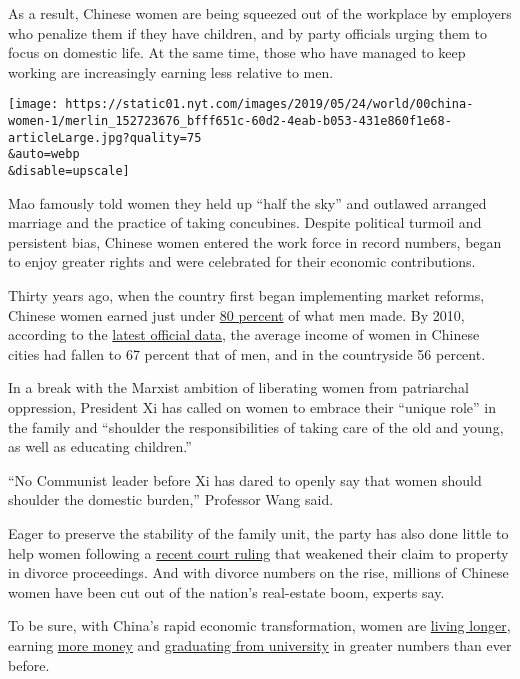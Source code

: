 As a result, Chinese women are being squeezed out of the workplace by
employers who penalize them if they have children, and by party
officials urging them to focus on domestic life. At the same time, those
who have managed to keep working are increasingly earning less relative
to men.

\texttt{[image: https://static01.nyt.com/images/2019/05/24/world/00china-women-1/merlin\_152723676\_bfff651c-60d2-4eab-b053-431e860f1e68-articleLarge.jpg?quality=75\\\&auto=webp\\\&disable=upscale]}

Mao famously told women they held up ``half the sky'' and outlawed
arranged marriage and the practice of taking concubines. Despite
political turmoil and persistent bias, Chinese women entered the work
force in record numbers, began to enjoy greater rights and were
celebrated for their economic contributions.

Thirty years ago, when the country first began implementing market
reforms, Chinese women earned just under
\href{http://www.stats.gov.cn/tjsj/tjgb/qttjgb/qgqttjgb/200203/t20020331_30606.html}{80
percent} of what men made. By 2010, according to the
\href{http://www.china.com.cn/zhibo/zhuanti/ch-xinwen/2011-10/21/content_23687810.htm}{latest
official data}, the average income of women in Chinese cities had fallen
to 67 percent that of men, and in the countryside 56 percent.

In a break with the Marxist ambition of liberating women from
patriarchal oppression, President Xi has called on women to embrace
their ``unique role'' in the family and ``shoulder the responsibilities
of taking care of the old and young, as well as educating children.''

``No Communist leader before Xi has dared to openly say that women
should shoulder the domestic burden,'' Professor Wang said.

Eager to preserve the stability of the family unit, the party has also
done little to help women following a
\href{https://www.nytimes.com/2011/09/08/world/asia/08iht-letter08.html}{recent
court ruling} that weakened their claim to property in divorce
proceedings. And with divorce numbers on the rise, millions of Chinese
women have been cut out of the nation's real-estate boom, experts say.

To be sure, with China's rapid economic transformation, women are
\href{http://www.chinadaily.com.cn/china/2017-07/26/content_30256796.htm}{living
longer}, earning
\href{https://core.ac.uk/download/pdf/41447073.pdf}{more money} and
\href{https://www.1xuezhe.exuezhe.com/Qk/art/465154?dbcode=1\&flag=2\&logohome=1}{graduating
from university} in greater numbers than ever before.

